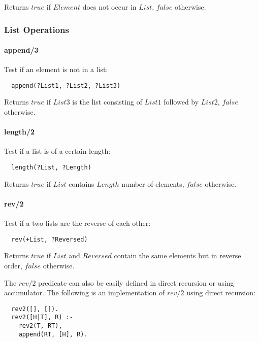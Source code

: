 \documentclass{article}
\begin{document}
\begin{multicols}{2}
 Returns $true$ if $Element$ does not occur in $List$, $false$ otherwise.
  
  \subsubsection{List Operations}

  \paragraph{append/3} Test if an element is not in a list:  
  
  \begin{lstlisting}
  append(?List1, ?List2, ?List3)
  \end{lstlisting} 
  
  Returns $true$ if $List3$ is the list consisting of $List1$ followed by $List2$, $false$ otherwise.
  
  \paragraph{length/2} Test if a list is of a certain length:
  
  \begin{lstlisting}
  length(?List, ?Length)
  \end{lstlisting} 
  
  Returns $true$ if $List$ contains $Length$ number of elements, $false$ otherwise.
  
  \paragraph{rev/2} Test if a two lists are the reverse of each other:
  
  \begin{lstlisting}
  rev(+List, ?Reversed)
  \end{lstlisting} 
  
  Returns $true$ if $List$ and $Reversed$ contain the same elements but in reverse order, $false$ otherwise.
  
  The $rev/2$ predicate can also be easily defined in direct recursion or using accumulator. The following is an implementation of $rev/2$ using direct recursion:
  
  \begin{lstlisting}
  rev2([], []).
  rev2([H|T], R) :-
    rev2(T, RT),
    append(RT, [H], R).
  \end{lstlisting}
  

\end{multicols}
\end{document}
